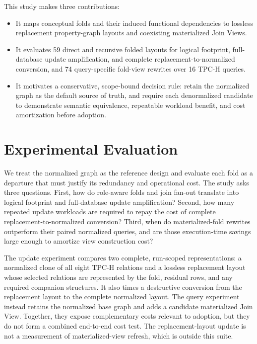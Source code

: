 \documentclass[sigconf]{acmart}
\begin{document}
This study makes three contributions:
\begin{itemize}[leftmargin=*]
  \item It maps conceptual folds and their induced functional dependencies to
  lossless replacement property-graph layouts and coexisting materialized Join
  Views.
  \item It evaluates 59 direct and recursive folded layouts for logical
  footprint, full-database update amplification, and complete
  replacement-to-normalized conversion, and 74 query-specific fold-view
  rewrites over 16 TPC-H queries.
  \item It motivates a conservative, scope-bound decision rule: retain the
  normalized graph as the default source of truth, and require each
  denormalized candidate to demonstrate semantic equivalence, repeatable
  workload benefit, and cost amortization before adoption.
\end{itemize}


\section{Experimental Evaluation}

We treat the normalized graph as the reference design and evaluate each fold
as a departure that must justify its redundancy and operational cost. The
study asks three questions. First, how do role-aware folds and join fan-out
translate into logical footprint and full-database update amplification?
Second, how many repeated update workloads are required to repay the cost of
complete replacement-to-normalized conversion?
Third, when do materialized-fold rewrites outperform their paired normalized
queries, and are those execution-time savings large enough to amortize view
construction cost?

The update experiment compares two complete, run-scoped representations: a
normalized clone of all eight TPC-H relations and a lossless replacement layout
whose selected relations are represented by the fold, residual rows, and any
required companion structures. It also times a destructive conversion from
the replacement layout to the complete normalized layout. The query experiment
instead retains the normalized base graph and adds a candidate materialized
Join View. Together, they expose complementary costs relevant to adoption, but
they do not form a combined end-to-end cost test. The replacement-layout update
is not a measurement of materialized-view refresh, which is outside this suite.
\end{document}
